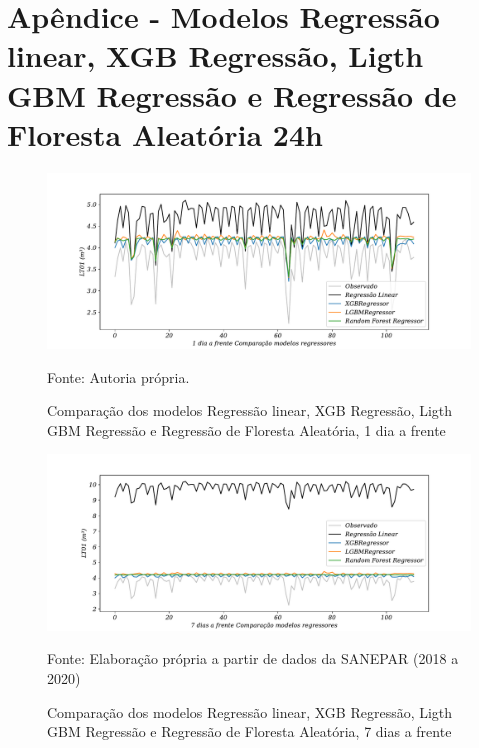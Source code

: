 
\section{Ap\^endice - Modelos Regress\~ao linear, XGB Regress\~ao, Ligth GBM Regress\~ao e Regress\~ao de Floresta Aleat\'oria 24h}\label{sec:lrxgblgbmrf24}

\begin{figure}[H]
	\centering
	\caption{Comparação dos modelos Regressão linear, XGB Regressão, Ligth GBM Regressão e Regressão de Floresta Aleatória, 1 dia a frente }
	\label{fig:1-LR-XGB-LGBM-RF24}
	\includegraphics[width=1\linewidth]{Apendices/Figuras/modelagem-24h/1-LR-XGB-LGBM-RF}
	
	Fonte: Autoria própria.
\end{figure}

\begin{figure}[H]
	\centering
	\caption{Comparação dos modelos Regressão linear, XGB Regressão, Ligth GBM Regressão e Regressão de Floresta Aleatória, 7 dias a frente }
	\label{fig:10-LR-XGB-LGBM-RF24}
	\includegraphics[width=1\linewidth]{Apendices/Figuras/modelagem-24h/7-LR-XGB-LGBM-RF}
	
Fonte: Elaboração própria a partir de dados da SANEPAR (2018 a 2020)
\end{figure}


